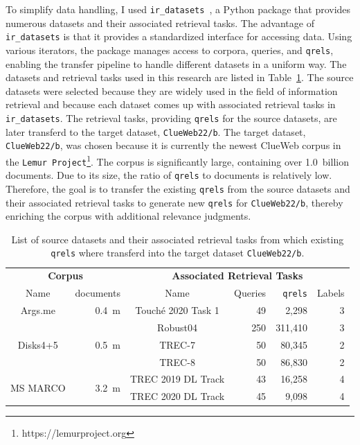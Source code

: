 To simplify data handling, I used \texttt{ir\_datasets}~\citep{macavaney:2021}, a Python package that provides numerous datasets and their associated retrieval tasks. The advantage of \texttt{ir\_datasets} is that it provides a standardized interface for accessing data. Using various iterators, the package manages access to corpora, queries, and \texttt{qrels}, enabling the transfer pipeline to handle different datasets in a uniform way. The datasets and retrieval tasks used in this research are listed in Table~\ref{tab:datasets}. The source datasets were selected because they are widely used in the field of information retrieval and because each dataset comes up with associated retrieval tasks in \texttt{ir\_datasets}. The retrieval tasks, providing \texttt{qrels} for the source datasets, are later transferd to the target dataset, \texttt{ClueWeb22/b}. The target dataset, \texttt{ClueWeb22/b}, was chosen because it is currently the newest ClueWeb corpus in the \texttt{Lemur Project}\footnote{https://lemurproject.org}. The corpus is significantly large, containing over 1.0~billion documents. Due to its size, the ratio of \texttt{qrels} to documents is relatively low. Therefore, the goal is to transfer the existing \texttt{qrels} from the source datasets and their associated retrieval tasks to generate new \texttt{qrels} for \texttt{ClueWeb22/b}, thereby enriching the corpus with additional relevance judgments. 

\begin{table}[t]
    \centering
    \footnotesize
    \caption{List of source datasets and their associated retrieval tasks from which existing \texttt{qrels} where transferd into the target dataset \texttt{ClueWeb22/b}.}
    \label{tab:datasets}
    \begin{tabular}{crcrrr}
        \toprule
        \multicolumn{2}{c}{\textbf{Corpus}} & \multicolumn{4}{c}{\textbf{ Associated Retrieval Tasks}} \\
        \cmidrule(lr){1-2} \cmidrule(lr){3-6}
        Name & documents  & Name & Queries &\texttt{qrels} & Labels \\
        \toprule
        
        Args.me & 0.4~m & Touché 2020 Task 1 & 49 & 2,298 & 3 \\
        \midrule

        \multirow{3}{*}{Disks4+5} & \multirow{3}{*}{0.5~m} & Robust04 & 250 & 311,410 & 3 \\
        & & TREC-7 & 50 & 80,345 & 2 \\
        & & TREC-8 & 50 & 86,830 & 2 \\
        \midrule

        \multirow{2}{*}{MS MARCO} & \multirow{2}{*}{3.2~m} & TREC 2019 DL Track & 43 & 16,258 & 4 \\
        & & TREC 2020 DL Track & 45 & 9,098 & 4 \\
        
        \bottomrule
    \end{tabular}
\end{table}


